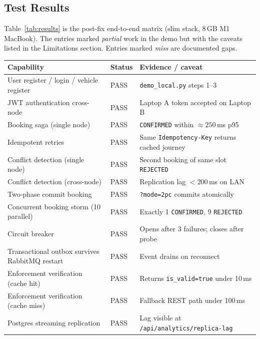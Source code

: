 \documentclass[12pt,a4paper]{article}
\begin{document}
\subsection{Test Results}
 
Table~\ref{tab:results} is the post-fix end-to-end matrix (slim stack, 8\,GB M1 MacBook). The entries marked \emph{partial} work in the demo but with the caveats listed in the Limitations section. Entries marked \emph{miss} are documented gaps.

\begin{table}[H]
\centering\footnotesize
\begin{tabularx}{\textwidth}{L{4.8cm} L{1.2cm} X}
  \toprule
  \textbf{Capability} & \textbf{Status} & \textbf{Evidence / caveat} \\
  \midrule
  User register / login / vehicle register & PASS & \texttt{demo\_local.py} steps 1--3 \\
  JWT authentication cross-node            & PASS & Laptop A token accepted on Laptop B \\
  Booking saga (single node)               & PASS & \texttt{CONFIRMED} within ${\approx}250$\,ms p95 \\
  Idempotent retries                       & PASS & Same \texttt{Idempotency-Key} returns cached journey \\
  Conflict detection (single node)         & PASS & Second booking of same slot \texttt{REJECTED} \\
  Conflict detection (cross-node)          & PASS & Replication lag ${<}200$\,ms on LAN \\
  Two-phase commit booking                 & PASS & \texttt{?mode=2pc} commits atomically \\
  Concurrent booking storm (10 parallel)   & PASS & Exactly 1 \texttt{CONFIRMED}, 9 \texttt{REJECTED} \\
  Circuit breaker                          & PASS & Opens after 3 failures; closes after probe \\
  Transactional outbox survives RabbitMQ restart & PASS & Event drains on reconnect \\
  Enforcement verification (cache hit)     & PASS & Returns \texttt{is\_valid=true} under 10\,ms \\
  Enforcement verification (cache miss)    & PASS & Fallback REST path under 100\,ms \\
  Postgres streaming replication           & PASS & Lag visible at \texttt{/api/analytics/replica-lag} \\

\end{tabularx}
\end{table}
\end{document}
